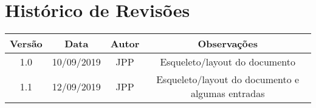 \chapter*{Histórico de Revisões}

\begin{center}
    \begin{tabular}{|c|c|c|c|}
        \hline
        Versão & Data       & Autor & Observações                                      \\
        \hline
        1.0    & 10/09/2019 & JPP   & Esqueleto/layout do documento                    \\
        \hline
        1.1    & 12/09/2019 & JPP   & Esqueleto/layout do documento e algumas entradas \\
        \hline
    \end{tabular}
\end{center}
